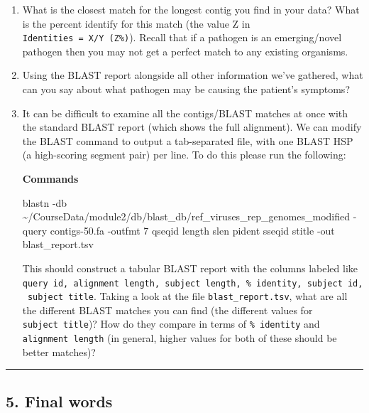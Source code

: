 \documentclass[
]{book}
\newenvironment{Shaded}{\begin{snugshade}}{\end{snugshade}}
\newcommand{\AttributeTok}[1]{\textcolor[rgb]{0.13,0.29,0.53}{#1}}
\newcommand{\ExtensionTok}[1]{#1}
\newcommand{\NormalTok}[1]{#1}
\newcommand{\StringTok}[1]{\textcolor[rgb]{0.31,0.60,0.02}{#1}}
\begin{document}
\begin{enumerate}
\def\labelenumi{\arabic{enumi}.}
\item
  What is the closest match for the longest contig you find in your data? What is the percent identify for this match (the value Z in \texttt{Identities\ =\ X/Y\ (Z\%)}). Recall that if a pathogen is an emerging/novel pathogen then you may not get a perfect match to any existing organisms.
\item
  Using the BLAST report alongside all other information we've gathered, what can you say about what pathogen may be causing the patient's symptoms?
\item
  It can be difficult to examine all the contigs/BLAST matches at once with the standard BLAST report (which shows the full alignment). We can modify the BLAST command to output a tab-separated file, with one BLAST HSP (a high-scoring segment pair) per line. To do this please run the following:

  \textbf{Commands}

\begin{Shaded}
\begin{Highlighting}[]
\ExtensionTok{blastn} \AttributeTok{{-}db}\NormalTok{ \textasciitilde{}/CourseData/module2/db/blast\_db/ref\_viruses\_rep\_genomes\_modified }\AttributeTok{{-}query}\NormalTok{ contigs{-}50.fa }\AttributeTok{{-}outfmt} \StringTok{\textquotesingle{}7 qseqid length slen pident sseqid stitle\textquotesingle{}} \AttributeTok{{-}out}\NormalTok{ blast\_report.tsv}
\end{Highlighting}
\end{Shaded}

  This should construct a tabular BLAST report with the columns labeled like \texttt{query\ id,\ alignment\ length,\ subject\ length,\ \%\ identity,\ subject\ id,\ subject\ title}. Taking a look at the file \texttt{blast\_report.tsv}, what are all the different BLAST matches you can find (the different values for \texttt{subject\ title})? How do they compare in terms of \texttt{\%\ identity} and \texttt{alignment\ length} (in general, higher values for both of these should be better matches)?
\end{enumerate}

\begin{center}\rule{0.5\linewidth}{0.5pt}\end{center}

\subsection{5. Final words}\label{final}
\end{document}
